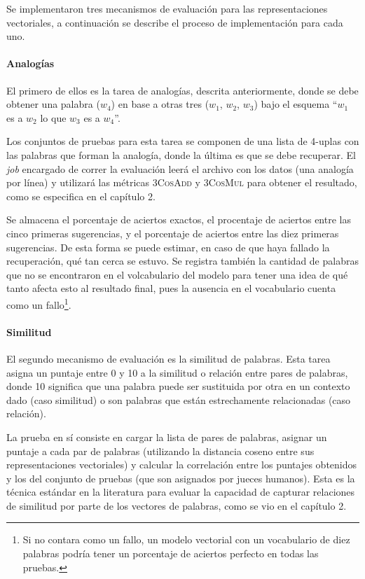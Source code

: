 Se implementaron tres mecanismos de evaluación para las representaciones vectoriales, a
continuación se describe el proceso de implementación para cada uno.


\paragraph{Analogías}

El primero de ellos es la tarea de analogías, descrita anteriormente, donde se debe obtener una
palabra ($w_4$) en base a otras tres ($w_1$, $w_2$, $w_3$) bajo el esquema ``$w_1$ es a $w_2$ lo que
$w_3$ es a $w_4$''.

Los conjuntos de pruebas para esta tarea se componen de una lista de 4-uplas con las palabras que
forman la analogía, donde la última es que se debe recuperar. El \textit{job} encargado de correr la
evaluación leerá el archivo con los datos (una analogía por línea) y utilizará las métricas
\textsc{3CosAdd} y \textsc{3CosMul} para obtener el resultado, como se especifica en el capítulo
2.

Se almacena el porcentaje de aciertos exactos, el procentaje de aciertos entre las cinco primeras
sugerencias, y el porcentaje de aciertos entre las diez primeras sugerencias. De esta forma se puede
estimar, en caso de que haya fallado la recuperación, qué tan cerca se estuvo. Se registra también
la cantidad de palabras que no se encontraron en el volcabulario del modelo para tener una idea de
qué tanto afecta esto al resultado final, pues la ausencia en el vocabulario cuenta como un
fallo\footnote{Si no contara como un fallo, un modelo vectorial con un vocabulario de diez palabras
podría tener un porcentaje de aciertos perfecto en todas las pruebas.}.


\paragraph{Similitud}

El segundo mecanismo de evaluación es la similitud de palabras. Esta tarea asigna un puntaje entre 0
y 10 a la similitud o relación entre pares de palabras, donde 10 significa que una palabra puede ser
sustituida por otra en un contexto dado (caso similitud) o son palabras que están estrechamente
relacionadas (caso relación).

La prueba en sí consiste en cargar la lista de pares de palabras, asignar un puntaje a cada par de
palabras (utilizando la distancia coseno entre sus representaciones vectoriales) y calcular la
correlación entre los puntajes obtenidos y los del conjunto de pruebas (que son asignados por jueces
humanos). Esta es la técnica estándar en la literatura para evaluar la capacidad de capturar
relaciones de similitud por parte de los vectores de palabras, como se vio en el capítulo 2.

